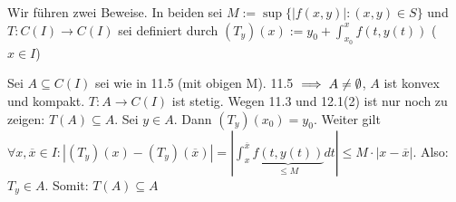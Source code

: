 \documentclass{article}
\begin{document}
Wir führen zwei Beweise. In beiden sei $M := \sup \{|f(x,y)| : (x,y) \in S\}$ und $T: C(I) \to C(I)$ sei definiert durch
$(T_y)(x) := y_0 + \int_{x_0}^{x}f(t,y(t))$ ($x \in I$)

\begin{beweis}[mit 11.3]
Sei $A \subseteq C(I)$ sei wie in 11.5 (mit obigen M). 11.5 $\implies A \neq \emptyset$, $A$ ist konvex und kompakt. $T:A \to C(I)$ ist stetig. 
Wegen 11.3 und 12.1(2) ist nur noch zu zeigen: $T(A) \subseteq A$. Sei $y \in A$. Dann $(T_y)(x_0) = y_0$. Weiter gilt \\ 
$\forall x,\overline{x} \in I : | (T_y)(x) - (T_y)(\overline{x}) | = | \int_{x}^{\overline{x}} \underbrace{f(t,y(t))}_{\leq M} dt | \leq M \cdot |x-\overline{x}|$. 
Also: $T_y \in A.$ Somit: $T(A) \subseteq A$
\end{beweis}
\end{document}
